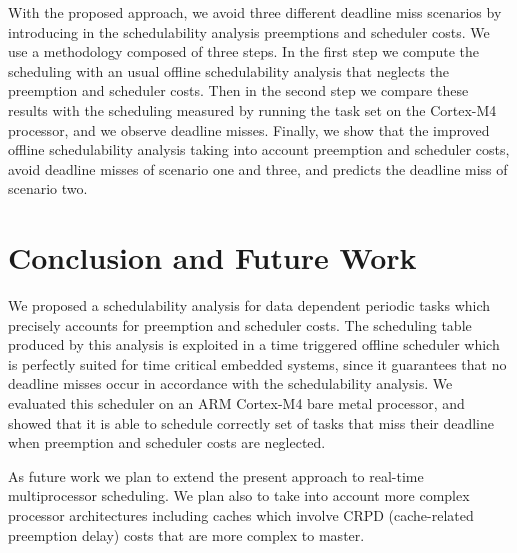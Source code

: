 \documentclass[conference,compsocconf]{IEEEtran}
\begin{document}
With the proposed approach, we avoid three different deadline miss scenarios by introducing in the schedulability analysis preemptions and scheduler costs. We use a methodology composed of three steps. In the first step we compute the scheduling with an usual offline schedulability analysis that neglects the preemption and scheduler costs. Then in the second step we compare these results with the scheduling measured by running the task set on the Cortex-M4 processor, and we    
observe deadline misses. Finally, we show that the improved offline schedulability analysis taking into account preemption and scheduler costs, avoid deadline misses of scenario one and three, and predicts the deadline miss of scenario two. 




\section{Conclusion and Future Work}

We proposed a schedulability analysis for data dependent periodic tasks which
precisely accounts for preemption and scheduler costs. The scheduling table
produced by this analysis is exploited in a time triggered offline scheduler
which is perfectly suited for time critical embedded systems, since it
guarantees that no deadline misses occur in accordance with the schedulability
analysis. We evaluated this scheduler on an ARM Cortex-M4 bare metal
processor, and showed that it is able to schedule correctly set of tasks that
miss their deadline when preemption and scheduler costs are neglected.

As future work we plan to extend the present approach to real-time
multiprocessor scheduling. We plan also to take into account more complex
processor architectures including caches which involve CRPD (cache-related
preemption delay) costs that are more complex to master.


 
 
\nocite{}
\end{document}
